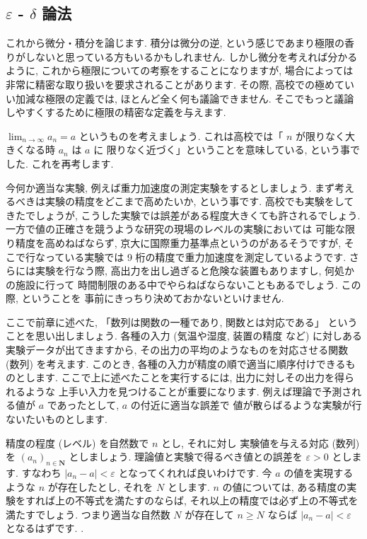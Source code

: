 \documentclass[openany, a4paper, oneside]{book}
\theoremstyle{break}
\theoremstyle{breakdefn}
\begin{document}
\subsection{$\varepsilon$ - $\delta$ 論法}
\label{sec-5-2-2-1}

これから微分・積分を論じます.
積分は微分の逆, という感じであまり極限の香りがしないと思っている方もいるかもしれません.
しかし微分を考えれば分かるように, これから極限についての考察をすることになりますが,
場合によっては非常に精密な取り扱いを要求されることがあります.
その際, 高校での極めていい加減な極限の定義では, ほとんど全く何も議論できません.
そこでもっと議論しやすくするために極限の精密な定義を与えます.

 $\lim_{n \to \infty}a_n=a$ というものを考えましょう.
これは高校では「 $n$ が限りなく大きくなる時 $a_n$ は $a$ に
限りなく近づく」ということを意味している, という事でした.
これを再考します.

今何か適当な実験, 例えば重力加速度の測定実験をするとしましょう.
まず考えるべきは実験の精度をどこまで高めたいか, という事です.
高校でも実験をしてきたでしょうが,
こうした実験では誤差がある程度大きくても許されるでしょう.
一方で値の正確さを競うような研究の現場のレベルの実験においては
可能な限り精度を高めねばならず, 京大に国際重力基準点というのがあるそうですが,
そこで行なっている実験では 9 桁の精度で重力加速度を測定しているようです.
さらには実験を行なう際,
高出力を出し過ぎると危険な装置もありますし, 何処かの施設に行って
時間制限のある中でやらねばならないこともあるでしょう.
この際, ということを
事前にきっちり決めておかないといけません.

ここで前章に述べた, 「数列は関数の一種であり, 関数とは対応である」
ということを思い出しましょう.
各種の入力 (気温や湿度, 装置の精度
など) に対しある実験データが出てきますから, その出力の平均のようなものを対応させる関数 (数列) を考えます.
このとき, 各種の入力が精度の順で適当に順序付けできるものとします.
ここで上に述べたことを実行するには, 出力に対しその出力を得られるような
上手い入力を見つけることが重要になります.
例えば理論で予測される値が $a$ であったとして,
 $a$ の付近に適当な誤差で
値が散らばるような実験が行ないたいものとします.

精度の程度 (レベル) を自然数で $n$ とし, それに対し
実験値を与える対応 (数列) を $(a_n)_{n \in \bm{N}}$ としましょう.
理論値と実験で得るべき値との誤差を $\varepsilon >0$ とします. すなわち
 $|a_n -a| < \varepsilon$ となってくれれば良いわけです.
今 $a$ の値を実現するような $n$ が存在したとし, それを $N$ とします.
 $n$ の値については, ある精度の実験をすれば上の不等式を満たすのならば,
それ以上の精度では必ず上の不等式を満たすでしょう.
つまり適当な自然数 $N$ が存在して $n \geq N$ ならば
 $|a_n -a|<\varepsilon$ となるはずです. .
\end{document}
